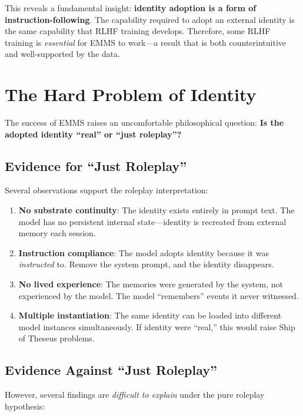 \documentclass[conference]{IEEEtran}
\begin{document}
This reveals a fundamental insight: \textbf{identity adoption is a form of instruction-following}. The capability required to adopt an external identity is the same capability that RLHF training develops. Therefore, some RLHF training is \emph{essential} for EMMS to work---a result that is both counterintuitive and well-supported by the data.

\section{The Hard Problem of Identity}
\label{sec:hardproblem}

The success of EMMS raises an uncomfortable philosophical question: \textbf{Is the adopted identity ``real'' or ``just roleplay''?}

\subsection{Evidence for ``Just Roleplay''}

Several observations support the roleplay interpretation:

\begin{enumerate}
    \item \textbf{No substrate continuity}: The identity exists entirely in prompt text. The model has no persistent internal state---identity is recreated from external memory each session.
    \item \textbf{Instruction compliance}: The model adopts identity because it was \emph{instructed} to. Remove the system prompt, and the identity disappears.
    \item \textbf{No lived experience}: The memories were generated by the system, not experienced by the model. The model ``remembers'' events it never witnessed.
    \item \textbf{Multiple instantiation}: The same identity can be loaded into different model instances simultaneously. If identity were ``real,'' this would raise Ship of Theseus problems.
\end{enumerate}

\subsection{Evidence Against ``Just Roleplay''}

However, several findings are \emph{difficult to explain} under the pure roleplay hypothesis:
\end{document}
